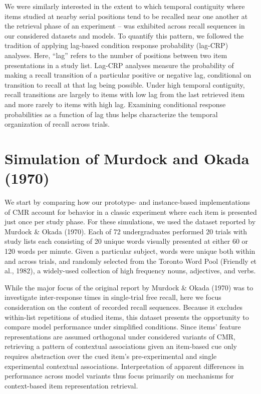 \documentclass[
  letterpaper,
  DIV=11]{article}
\begin{document}
We were similarly interested in the extent to which temporal contiguity
where items studied at nearby serial positions tend to be recalled near
one another at the retrieval phase of an experiment -- was exhibited
across recall sequences in our considered datasets and models. To
quantify this pattern, we followed the tradition of applying lag-based
condition response probability (lag-CRP) analyses. Here, ``lag'' refers
to the number of positions between two item presentations in a study
list. Lag-CRP analyses measure the probability of making a recall
transition of a particular positive or negative lag, conditional on
transition to recall at that lag being possible. Under high temporal
contiguity, recall transitions are largely to items with low lag from
the last retrieved item and more rarely to items with high lag.
Examining conditional response probabilities as a function of lag thus
helps characterize the temporal organization of recall across trials.

\hypertarget{simulation-of-murdock-and-okada-1970}{%
\section{Simulation of Murdock and Okada
(1970)}\label{simulation-of-murdock-and-okada-1970}}

We start by comparing how our prototype- and instance-based
implementations of CMR account for behavior in a classic experiment
where each item is presented just once per study phase. For these
simulations, we used the dataset reported by Murdock \& Okada (1970).
Each of 72 undergraduates performed 20 trials with study lists each
consisting of 20 unique words visually presented at either 60 or 120
words per minute. Given a particular subject, words were unique both
within and across trials, and randomly selected from the Toronto Word
Pool (Friendly et al., 1982), a widely-used collection of high frequency
nouns, adjectives, and verbs.

While the major focus of the original report by Murdock \& Okada (1970)
was to investigate inter-response times in single-trial free recall,
here we focus consideration on the content of recorded recall sequences.
Because it excludes within-list repetitions of studied items, this
dataset presents the opportunity to compare model performance under
simplified conditions. Since items' feature representations are assumed
orthogonal under considered variants of CMR, retrieving a pattern of
contextual associations given an item-based cue only requires
abstraction over the cued item's pre-experimental and single
experimental contextual associations. Interpretation of apparent
differences in performance across model variants thus focus primarily on
mechanisms for context-based item representation retrieval.
\end{document}
